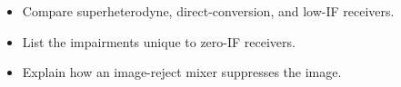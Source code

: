 \begin{objectives}
\begin{itemize}[leftmargin=1.4em,itemsep=2pt]
\item Compare superheterodyne, direct-conversion, and low-IF receivers.
\item List the impairments unique to zero-IF receivers.
\item Explain how an image-reject mixer suppresses the image.
\end{itemize}
\end{objectives}
